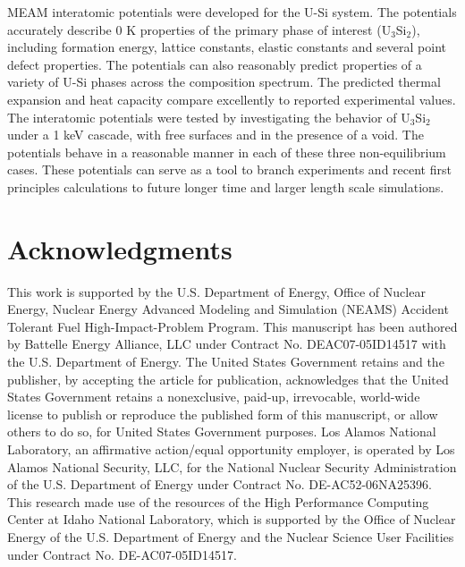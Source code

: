 \documentclass[review]{elsarticle}
\begin{document}
MEAM interatomic potentials were developed for the U-Si system.  The potentials accurately describe 0 K properties of the primary phase of interest (U$_{3}$Si$_{2}$), including formation energy, lattice constants, elastic constants and several point defect properties.  The potentials can also reasonably predict properties of a variety of U-Si phases across the composition spectrum.  The predicted thermal expansion and heat capacity compare excellently to reported experimental values.  The interatomic potentials were tested by investigating the behavior of U$_{3}$Si$_{2}$ under a 1 keV cascade, with free surfaces and in the presence of a void.  The potentials behave in a reasonable manner in each of these three non-equilibrium cases.  These potentials can serve as a tool to branch experiments and recent first principles calculations to future longer time and larger length scale simulations.  

\section{Acknowledgments}
This work is supported by the U.S. Department of Energy, Office of Nuclear Energy, Nuclear Energy Advanced Modeling and Simulation (NEAMS) Accident Tolerant Fuel High-Impact-Problem Program. This manuscript has been authored by Battelle Energy Alliance, LLC under Contract No. DEAC07-05ID14517 with the U.S. Department of Energy. The United States Government retains and the publisher, by accepting the article for publication, acknowledges that the United States Government retains a nonexclusive, paid-up, irrevocable, world-wide license to publish or reproduce the published form of this manuscript, or allow others to do so, for United States Government purposes.  Los Alamos National Laboratory, an affirmative action/equal opportunity employer, is operated by Los Alamos National Security, LLC, for the National Nuclear Security Administration of the U.S. Department of Energy under Contract No. DE-AC52-06NA25396.  This research made use of the resources of the High Performance Computing Center at Idaho National Laboratory, which is supported by the Office of Nuclear Energy of the U.S. Department of Energy and the Nuclear Science User Facilities under Contract No. DE-AC07-05ID14517.
\end{document}
